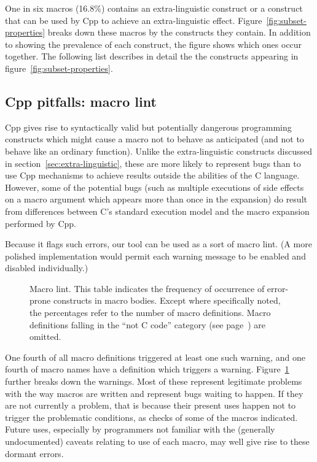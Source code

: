 \documentclass[10pt]{article}
\begin{document}
One in six macros (16.8\%) contains an extra-linguistic construct or a
construct that can be used by Cpp to achieve an extra-linguistic effect.
Figure~\ref{fig:subset-properties} breaks down these macros by the
constructs they contain.  In addition to showing the prevalence of each
construct, the figure shows which ones occur together.  The following list
describes in detail the the constructs appearing in
figure~\ref{fig:subset-properties}.

{}



\subsection{Cpp pitfalls:  macro lint}
\label{sec:lint}

Cpp gives rise to syntactically valid but potentially dangerous programming
constructs which might cause a macro not to behave as anticipated (and not
to behave like an ordinary function).  Unlike the extra-linguistic
constructs discussed in section~\ref{sec:extra-linguistic}, these are more
likely to represent bugs than to use Cpp mechanisms to achieve results
outside the abilities of the C language.  However, some of the potential
bugs (such as multiple executions of side effects on a macro argument
which appears more than once in the expansion) do
result from differences between C's standard execution model and the
macro expansion performed by Cpp.

Because it flags such errors, our tool can be used as a sort of macro lint.
(A more polished implementation would permit each warning message to be
enabled and disabled individually.)

\begin{figure}
  {\small\centerline{}}
  
  \caption{Macro lint.  This table indicates the frequency of occurrence of
    error-prone constructs in macro bodies.  Except where specifically
    noted, the percentages refer to the number of macro definitions.  Macro
    definitions falling in the ``not C code'' category (see
    page~\pageref{page:not-c-code}) are omitted.}
  \label{fig:macro-lint}
\end{figure}

One fourth of all macro definitions triggered at least one such warning,
and one fourth of macro names have a definition which triggers a warning.
Figure~\ref{fig:macro-lint} further breaks down the warnings.  Most of
these represent legitimate problems with the way macros are written and
represent bugs waiting to happen.  If they are not currently a problem,
that is because their present uses happen not to trigger the problematic
conditions, as checks of some of the macros indicated.  Future uses,
especially by programmers not familiar with the (generally undocumented)
caveats relating to use of each macro, may well give rise to these dormant
errors.  
\end{document}
